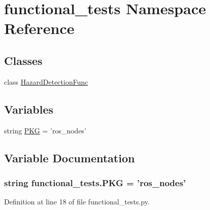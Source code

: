 \hypertarget{namespacefunctional__tests}{\section{functional\-\_\-tests Namespace Reference}
\label{namespacefunctional__tests}
}
\subsection*{Classes}
\begin{DoxyCompactItemize}
\item 
class \hyperlink{classfunctional__tests_1_1HazardDetectionFunc}{Hazard\-Detection\-Func}
\end{DoxyCompactItemize}
\subsection*{Variables}
\begin{DoxyCompactItemize}
\item 
string \hyperlink{namespacefunctional__tests_a78507f367d6307db1c1633379cbccc35}{P\-K\-G} = 'ros\-\_\-nodes'
\end{DoxyCompactItemize}


\subsection{Variable Documentation}
\hypertarget{namespacefunctional__tests_a78507f367d6307db1c1633379cbccc35}{
\subsubsection[{P\-K\-G}]{\setlength{\rightskip}{0pt plus 5cm}string functional\-\_\-tests.\-P\-K\-G = 'ros\-\_\-nodes'}}\label{namespacefunctional__tests_a78507f367d6307db1c1633379cbccc35}


Definition at line 18 of file functional\-\_\-tests.\-py.

